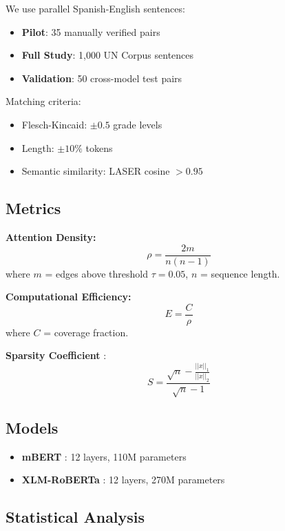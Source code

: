 \documentclass[11pt,a4paper]{article}
\begin{document}
We use parallel Spanish-English sentences:
\begin{itemize}
    \item \textbf{Pilot}: 35 manually verified pairs
    \item \textbf{Full Study}: 1,000 UN Corpus sentences \cite{ziemski2016}
    \item \textbf{Validation}: 50 cross-model test pairs
\end{itemize}

Matching criteria:
\begin{itemize}
    \item Flesch-Kincaid: $\pm 0.5$ grade levels
    \item Length: $\pm 10\%$ tokens
    \item Semantic similarity: LASER cosine $> 0.95$ \cite{artetxe2019}
\end{itemize}

\subsection{Metrics}

\textbf{Attention Density:}
\begin{equation}
\rho = \frac{2m}{n(n-1)}
\end{equation}
where $m$ = edges above threshold $\tau = 0.05$, $n$ = sequence length.

\textbf{Computational Efficiency:}
\begin{equation}
E = \frac{C}{\rho}
\end{equation}
where $C$ = coverage fraction.

\textbf{Sparsity Coefficient} \cite{hoyer2004}:
\begin{equation}
S = \frac{\sqrt{n} - \frac{||x||_1}{||x||_2}}{\sqrt{n} - 1}
\end{equation}

\subsection{Models}

\begin{itemize}
    \item \textbf{mBERT} \cite{devlin2019}: 12 layers, 110M parameters
    \item \textbf{XLM-RoBERTa} \cite{conneau2020}: 12 layers, 270M parameters
\end{itemize}

\subsection{Statistical Analysis}
\end{document}
